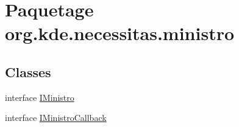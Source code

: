 \hypertarget{namespaceorg_1_1kde_1_1necessitas_1_1ministro}{\section{Paquetage org.\-kde.\-necessitas.\-ministro}
\label{namespaceorg_1_1kde_1_1necessitas_1_1ministro}
}
\subsection*{Classes}
\begin{DoxyCompactItemize}
\item 
interface \hyperlink{interfaceorg_1_1kde_1_1necessitas_1_1ministro_1_1_i_ministro}{I\-Ministro}
\item 
interface \hyperlink{interfaceorg_1_1kde_1_1necessitas_1_1ministro_1_1_i_ministro_callback}{I\-Ministro\-Callback}
\end{DoxyCompactItemize}
